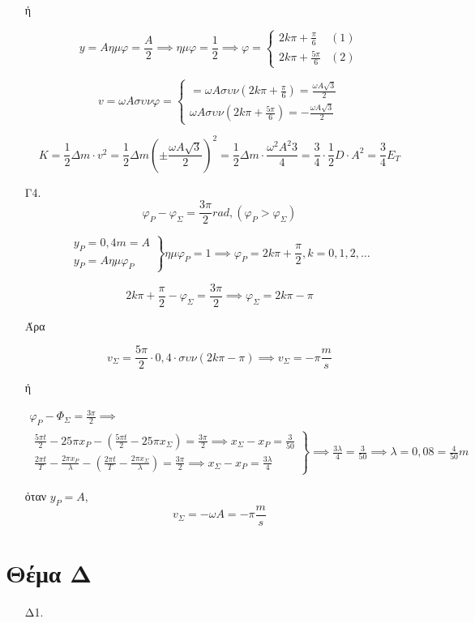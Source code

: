 \documentclass[12pt]{article}
\begin{document}
\begin{enumerate}
      ή

      $$y=Aημφ=\frac{A}{2}\implies ημφ=\frac{1}{2}\implies φ=\begin{cases}2k\pi+\frac{\pi}{6} & (1) \\ 2k\pi + \frac{5\pi}{6} & (2)\end{cases}$$

      $$v=ωAσυνφ=\begin{cases}=ωAσυν\left(2k\pi+\frac{\pi}{6}\right)=\frac{ωA\sqrt{3}}{2} \\ ωAσυν\left(2k\pi+\frac{5\pi}{6}\right)=-\frac{ωA\sqrt{3}}{2}\end{cases}$$

      $$K=\frac{1}{2}Δm\cdot v^2=\frac{1}{2}Δm\left(\pm \frac{ωA\sqrt{3}}{2} \right)^2=\frac{1}{2}Δm\cdot \frac{ω^2A^2 3}{4}=\frac{3}{4}\cdot\frac{1}{2}D\cdot A^2=\frac{3}{4}E_T$$

      \item [Γ4.]
      $$φ_Ρ-φ_Σ=\frac{3\pi}{2}rad,(φ_Ρ>φ_Σ)$$

      $$\left. \begin{matrix}y_Ρ=0,4m=A \\ y_Ρ=Aημφ_Ρ\end{matrix} \right\} ημφ_Ρ=1\implies φ_Ρ=2k\pi+\frac{\pi}{2},k=0,1,2,\ldots$$

      $$2k\pi+\frac{\pi}{2}-φ_Σ=\frac{3\pi}{2}\implies φ_Σ=2k\pi-\pi$$

      Άρα

      $$v_Σ=\frac{5\pi}{2}\cdot 0,4\cdot συν\left(2k\pi-\pi\right)\implies v_Σ=-\pi \frac{m}{s}$$

      ή

      \begin{gather*}
        φ_Ρ-Φ_Σ=\frac{3\pi}{2}\implies \\
        \left. \begin{matrix}\frac{5\pi t}{2}-25\pi x_Ρ-\left(\frac{5\pi t}{2}-25\pi x_Σ\right)=\frac{3\pi}{2}\implies x_Σ-x_Ρ=\frac{3}{50} \\ \frac{2\pi t}{T}-\frac{2\pi x_Ρ}{λ}-\left(\frac{2\pi t}{T}-\frac{2\pi x_Σ}{λ}\right)=\frac{3\pi}{2}\implies x_Σ-x_Ρ=\frac{3λ}{4}\end{matrix} \right\}\implies \frac{3λ}{4}=\frac{3}{50}\implies λ=0,08=\frac{4}{50}m
      \end{gather*}

      όταν $y_Ρ=A$, $$v_Σ=-ωA=-\pi \frac{m}{s}$$
  \end{enumerate}

  \section*{Θέμα Δ}

  \begin{enumerate}
    \item [Δ1.] 
  \end{enumerate}
\end{document}
